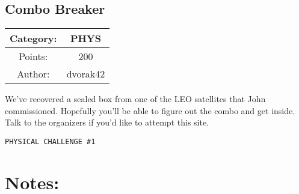 \begin{center}
\section*{Combo Breaker}
{\large
\begin{tabular}{| c c |}
\hline
Category: & PHYS\\\hline
Points: & 200\\\hline
Author: & dvorak42\\\hline
\end{tabular}
}
\end{center}
\vspace{0.5in}

{\large
We've recovered a sealed box from one of the LEO satellites that John commissioned. Hopefully you'll be able to figure out the combo and get inside. Talk to the organizers if you'd like to attempt this site.}
\vspace{0.25in}
\begin{center}
  {\Large\tt PHYSICAL CHALLENGE \#1}
\end{center}

\vspace{0.25in}
\section*{Notes:}
